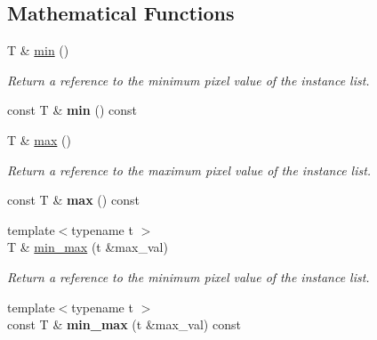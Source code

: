 \subsection*{Mathematical Functions}
\label{_amgrp2cea901d85d98e5ef43355db4a654e99}
 \begin{DoxyCompactItemize}
\item 
\hypertarget{structcimg__library_1_1CImgList_a4dfdacede15a60eb00a588a9f3d4839a}{
T \& \hyperlink{structcimg__library_1_1CImgList_a4dfdacede15a60eb00a588a9f3d4839a}{min} ()}
\label{structcimg__library_1_1CImgList_a4dfdacede15a60eb00a588a9f3d4839a}

\begin{DoxyCompactList}\small\item\em Return a reference to the minimum pixel value of the instance list. \item\end{DoxyCompactList}\item 
\hypertarget{structcimg__library_1_1CImgList_a01164a5a9ce47a184c451d53f145cf44}{
const T \& {\bfseries min} () const }
\label{structcimg__library_1_1CImgList_a01164a5a9ce47a184c451d53f145cf44}

\item 
\hypertarget{structcimg__library_1_1CImgList_a301155b753f6ab13ff25f164f389e142}{
T \& \hyperlink{structcimg__library_1_1CImgList_a301155b753f6ab13ff25f164f389e142}{max} ()}
\label{structcimg__library_1_1CImgList_a301155b753f6ab13ff25f164f389e142}

\begin{DoxyCompactList}\small\item\em Return a reference to the maximum pixel value of the instance list. \item\end{DoxyCompactList}\item 
\hypertarget{structcimg__library_1_1CImgList_af1a616293569fbda2a769b612c86a8ab}{
const T \& {\bfseries max} () const }
\label{structcimg__library_1_1CImgList_af1a616293569fbda2a769b612c86a8ab}

\item 
\hypertarget{structcimg__library_1_1CImgList_ae5f7f2487cee985fa4e386644a2c0563}{
{\footnotesize template$<$typename t $>$ }\\T \& \hyperlink{structcimg__library_1_1CImgList_ae5f7f2487cee985fa4e386644a2c0563}{min\_\-max} (t \&max\_\-val)}
\label{structcimg__library_1_1CImgList_ae5f7f2487cee985fa4e386644a2c0563}

\begin{DoxyCompactList}\small\item\em Return a reference to the minimum pixel value of the instance list. \item\end{DoxyCompactList}\item 
\hypertarget{structcimg__library_1_1CImgList_a55d6667ec189587a86657535bc70bb4a}{
{\footnotesize template$<$typename t $>$ }\\const T \& {\bfseries min\_\-max} (t \&max\_\-val) const }
\label{structcimg__library_1_1CImgList_a55d6667ec189587a86657535bc70bb4a}


\end{DoxyCompactItemize}
